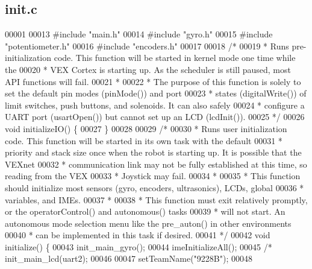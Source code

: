 \subsection{init.\+c}
\label{init_8c_source}

\begin{DoxyCode}
00001 
00013 \textcolor{preprocessor}{#include "main.h"}
00014 \textcolor{preprocessor}{#include "gyro.h"}
00015 \textcolor{preprocessor}{#include "potentiometer.h"}
00016 \textcolor{preprocessor}{#include "encoders.h"}
00017 
00018 \textcolor{comment}{/*}
00019 \textcolor{comment}{ * Runs pre-initialization code. This function will be started in kernel mode one time while the}
00020 \textcolor{comment}{ * VEX Cortex is starting up. As the scheduler is still paused, most API functions will fail.}
00021 \textcolor{comment}{ *}
00022 \textcolor{comment}{ * The purpose of this function is solely to set the default pin modes (pinMode()) and port}
00023 \textcolor{comment}{ * states (digitalWrite()) of limit switches, push buttons, and solenoids. It can also safely}
00024 \textcolor{comment}{ * configure a UART port (usartOpen()) but cannot set up an LCD (lcdInit()).}
00025 \textcolor{comment}{ */}
00026 \textcolor{keywordtype}{void} initializeIO() \{
00027 \}
00028 
00029 \textcolor{comment}{/*}
00030 \textcolor{comment}{ * Runs user initialization code. This function will be started in its own task with the default}
00031 \textcolor{comment}{ * priority and stack size once when the robot is starting up. It is possible that the VEXnet}
00032 \textcolor{comment}{ * communication link may not be fully established at this time, so reading from the VEX}
00033 \textcolor{comment}{ * Joystick may fail.}
00034 \textcolor{comment}{ *}
00035 \textcolor{comment}{ * This function should initialize most sensors (gyro, encoders, ultrasonics), LCDs, global}
00036 \textcolor{comment}{ * variables, and IMEs.}
00037 \textcolor{comment}{ *}
00038 \textcolor{comment}{ * This function must exit relatively promptly, or the operatorControl() and autonomous() tasks}
00039 \textcolor{comment}{ * will not start. An autonomous mode selection menu like the pre\_auton() in other environments}
00040 \textcolor{comment}{ * can be implemented in this task if desired.}
00041 \textcolor{comment}{ */}
00042 \textcolor{keywordtype}{void} initialize() \{
00043   init_main_gyro();
00044   imeInitializeAll();
00045 \textcolor{comment}{/*  init\_main\_lcd(uart2);}
00046 \textcolor{comment}{}
00047 \textcolor{comment}{  setTeamName("9228B");}
00048 \textcolor{comment}{}

\end{DoxyCode}
